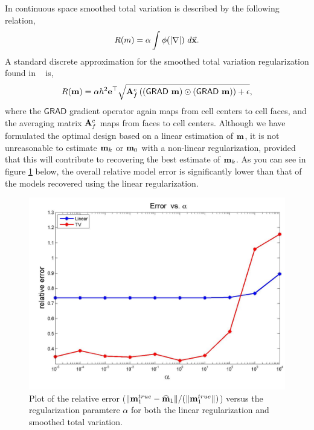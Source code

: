 \documentclass[english]{siamltex}
\newcommand{\bfA}	{{\bf{A}}}
\newcommand{\bfe}	{{\bf{e}}}
\newcommand{\bfm}	{{\bf{m}}}
\newcommand{\bfmhat}    {{\widehat{\bfm}}}
\newcommand {\vx}    {\vec {\bf x}}
\newcommand{\grad}	{\ensuremath {{\bf{ \nabla}}}}
\newcommand{\GRADh}  {{\textsf{GRAD}}} %
\renewcommand{\bfmhat}	{\widehat{\bf m}}
\begin{document}
{In continuous space smoothed total variation is described by the following relation,
\begin{equation}
		R(m) = \alpha \int  \phi(|\grad |) \ d\vx.
\end{equation} 
A standard discrete 
approximation for the smoothed total variation regularization found in ~\cite{ahh} is, 
\begin{equation}
\label{regsd}
R(\bfm) = \alpha h^2 \bfe^{\top} \sqrt{ \bfA_{f}^{c} \left( (\GRADh\ \bfm) \odot (\GRADh\ \bfm) \right)  + \epsilon},
\end{equation}
where the $\GRADh$ gradient operator again maps from cell centers to cell faces, and the averaging matrix $\bfA_{f}^{c}$ maps from faces to cell centers. 
Although we have formulated the optimal design based on a linear estimation of $\bfm$, it is not unreasonable to estimate $\bfm_k$ or $\bfm_0$ with a non-linear regularization, provided that this will contribute to recovering the best estimate of $\bfm_k$. As you can see in figure \ref{fig:erro1} below, the overall relative model error is significantly lower than that of the models recovered using the linear regularization. 
%
\begin{figure}[!h]
\begin{center}
\iwidth=180mm
\includegraphics[width=.6\iwidth]{figures/newFigs/exp2-error1}
\end{center}
\caption{Plot of the relative error ($\|\bfm_1^{true}-\bfmhat_1\|/(    \|\bfm^{true}_1\|)$) versus the regularization paramtere $\alpha$ for both the linear regularization and smoothed total variation. }
	\label{fig:erro1}
\end{figure} 








}
\end{document}
